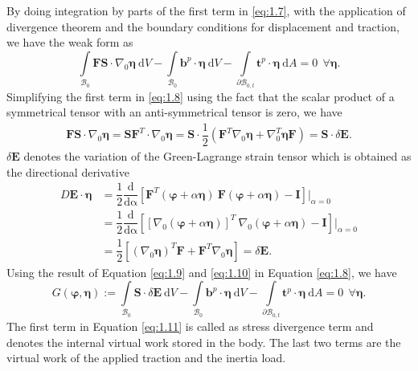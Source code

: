 \documentclass[11pt,a4paper,final]{article}
\begin{document}
By doing integration by parts of the first term in \eqref{eq:1.7}, with the application of divergence theorem and the boundary conditions for displacement and traction, we have the weak form as 
\begin{equation}
\int\limits_{\mathcal{B}_0} \mathbf{F S} \cdot \nabla_0 \bm{\eta} \ \mathrm{d}V - \int\limits_{\mathcal{B}_0} \mathbf{b}^p \cdot \bm{\eta} \ \mathrm{d}V - \int\limits_{\mathcal{\partial B}_{0,t}} \mathbf{t}^p \cdot \bm{\eta} \ \mathrm{d}A = 0 \ \ \forall \bm{\eta}.
\label{eq:1.8}
\end{equation}
Simplifying the first term in \eqref{eq:1.8} using the fact that the scalar product of a symmetrical tensor with an anti-symmetrical tensor is zero, we have
\begin{align}
\mathbf{F S} \cdot \nabla_0 \bm{\eta} = \mathbf{S} \mathbf{F}^T \cdot \nabla_0 \bm{\eta} = \mathbf{S} \cdot \dfrac{1}{2} (\mathbf{F}^T \nabla_0 \bm{\eta} + \nabla_0^T \bm{\eta} \mathbf{F}) = \mathbf{S} \cdot \delta \mathbf{E}.
\label{eq:1.9}
\end{align}
$\delta \mathbf{E}$ denotes the variation of the Green-Lagrange strain tensor which is obtained as the directional derivative
\begin{align}
D\mathbf{E} \cdot \bm{\eta} &= \dfrac{1}{2} \dfrac{\mathrm{d}}{\mathrm{d\alpha}} \left[ \mathbf{F}^T (\bm{\varphi} + \alpha \bm{\eta}) \ \mathbf{F}(\bm{\varphi} + \alpha \bm{\eta}) - \mathbf{I} \right] \Big|_{\alpha = 0} \nonumber \\
&= \dfrac{1}{2} \dfrac{\mathrm{d}}{\mathrm{d\alpha}} \left[ {\left[ \nabla_0 (\bm{\varphi} + \alpha \bm{\eta}) \right]}^T \ \nabla_0(\bm{\varphi} + \alpha \bm{\eta}) - \mathbf{I} \right] \Big|_{\alpha = 0} \nonumber \\
&= \dfrac{1}{2} \left[ (\nabla_0 \bm{\eta})^T \mathbf{F} + \mathbf{F}^T \nabla_0 \bm{\eta} \right] = \delta \mathbf{E}.
\label{eq:1.10}
\end{align}
Using the result of Equation \eqref{eq:1.9} and \eqref{eq:1.10} in Equation \eqref{eq:1.8}, we have
\begin{equation}
G(\bm{\varphi},\bm{\eta}):= \int\limits_{\mathcal{B}_0} \mathbf{S} \cdot \delta \mathbf{E} \ \mathrm{d}V - \int\limits_{\mathcal{B}_0} \mathbf{b}^p \cdot \bm{\eta} \ \mathrm{d}V - \int\limits_{\mathcal{\partial B}_{0,t}} \mathbf{t}^p \cdot \bm{\eta} \ \mathrm{d}A = 0 \ \ \forall \bm{\eta}.
\label{eq:1.11}
\end{equation}
The first term in Equation \eqref{eq:1.11} is called as  stress divergence term and denotes the internal virtual work stored in the body. The last two terms are the virtual work of the applied traction and the inertia load.
\end{document}
